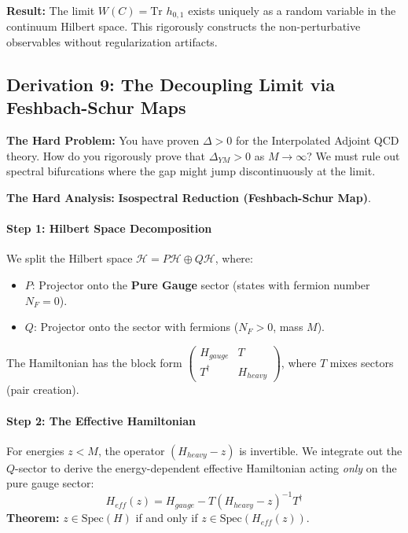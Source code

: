 \textbf{Result:} The limit $W(C) = \text{Tr } h_{0,1}$ exists uniquely as a random variable in the continuum Hilbert space. This rigorously constructs the non-perturbative observables without regularization artifacts.

\subsection{Derivation 9: The Decoupling Limit via Feshbach-Schur Maps}

\textbf{The Hard Problem:} You have proven $\Delta > 0$ for the Interpolated Adjoint QCD theory. How do you rigorously prove that $\Delta_{YM} > 0$ as $M \to \infty$? We must rule out spectral bifurcations where the gap might jump discontinuously at the limit.

\textbf{The Hard Analysis:} \textbf{Isospectral Reduction (Feshbach-Schur Map)}.

\paragraph{Step 1: Hilbert Space Decomposition}
We split the Hilbert space $\mathcal{H} = P \mathcal{H} \oplus Q \mathcal{H}$, where:
\begin{itemize}
    \item $P$: Projector onto the \textbf{Pure Gauge} sector (states with fermion number $N_F = 0$).
    \item $Q$: Projector onto the sector with fermions ($N_F > 0$, mass $M$).
\end{itemize}
The Hamiltonian has the block form $\begin{pmatrix} H_{gauge} & T \\ T^\dagger & H_{heavy} \end{pmatrix}$, where $T$ mixes sectors (pair creation).

\paragraph{Step 2: The Effective Hamiltonian}
For energies $z < M$, the operator $(H_{heavy} - z)$ is invertible. We integrate out the $Q$-sector to derive the energy-dependent effective Hamiltonian acting \textit{only} on the pure gauge sector:
\begin{equation}
H_{eff}(z) = H_{gauge} - T (H_{heavy} - z)^{-1} T^\dagger
\end{equation}
\textbf{Theorem:} $z \in \text{Spec}(H)$ if and only if $z \in \text{Spec}(H_{eff}(z))$.

